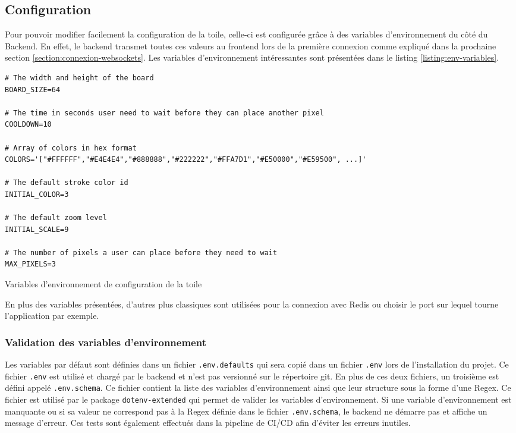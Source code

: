 \subsection{Configuration}

Pour pouvoir modifier facilement la configuration de la toile, celle-ci est configurée grâce à des variables d'environnement du côté du Backend. En effet, le backend transmet toutes ces valeurs au frontend lors de la première connexion comme expliqué dans la prochaine section \ref{section:connexion-websockets}. Les variables d'environnement intéressantes sont présentées dans le listing \ref{listing:env-variables}.

\begin{listing}[H]
  \begin{verbatim}
# The width and height of the board
BOARD_SIZE=64

# The time in seconds user need to wait before they can place another pixel
COOLDOWN=10

# Array of colors in hex format
COLORS='["#FFFFFF","#E4E4E4","#888888","#222222","#FFA7D1","#E50000","#E59500", ...]'

# The default stroke color id
INITIAL_COLOR=3

# The default zoom level
INITIAL_SCALE=9

# The number of pixels a user can place before they need to wait
MAX_PIXELS=3
\end{verbatim}
  \caption{Variables d'environnement de configuration de la toile}
  \label{listing:env-variables}
\end{listing}

En plus des variables présentées, d'autres plus classiques sont utilisées pour la connexion avec Redis ou choisir le port sur lequel tourne l'application par exemple.

\subsubsection{Validation des variables d'environnement}

Les variables par défaut sont définies dans un fichier \texttt{.env.defaults} qui sera copié dans un fichier \texttt{.env} lors de l'installation du projet. Ce fichier \texttt{.env} est utilisé et chargé par le backend et n'est pas versionné sur le répertoire git. En plus de ces deux fichiers, un troisième est défini appelé \texttt{.env.schema}. Ce fichier contient la liste des variables d'environnement ainsi que leur structure sous la forme d'une Regex. Ce fichier est utilisé par le package \texttt{dotenv-extended} \cite{dotenv-extended} qui permet de valider les variables d'environnement. Si une variable d'environnement est manquante ou si sa valeur ne correspond pas à la Regex définie dans le fichier \texttt{.env.schema}, le backend ne démarre pas et affiche un message d'erreur. Ces tests sont également effectués dans la pipeline de CI/CD afin d'éviter les erreurs inutiles.

